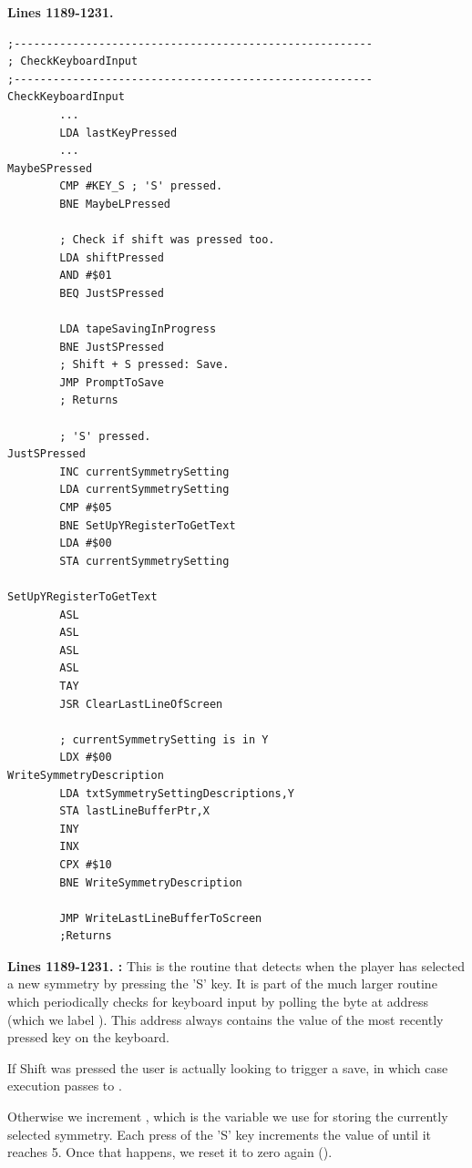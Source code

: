 \clearpage
\textbf{Lines 1189-1231. }
\begin{lstlisting}
;-------------------------------------------------------
; CheckKeyboardInput
;-------------------------------------------------------
CheckKeyboardInput   
        ...
        LDA lastKeyPressed
        ...
MaybeSPressed   
        CMP #KEY_S ; 'S' pressed.
        BNE MaybeLPressed

        ; Check if shift was pressed too.
        LDA shiftPressed
        AND #$01
        BEQ JustSPressed

        LDA tapeSavingInProgress
        BNE JustSPressed
        ; Shift + S pressed: Save.
        JMP PromptToSave
        ; Returns

        ; 'S' pressed. 
JustSPressed   
        INC currentSymmetrySetting
        LDA currentSymmetrySetting
        CMP #$05
        BNE SetUpYRegisterToGetText
        LDA #$00
        STA currentSymmetrySetting

SetUpYRegisterToGetText   
        ASL 
        ASL 
        ASL 
        ASL 
        TAY 
        JSR ClearLastLineOfScreen

        ; currentSymmetrySetting is in Y
        LDX #$00
WriteSymmetryDescription   
        LDA txtSymmetrySettingDescriptions,Y
        STA lastLineBufferPtr,X
        INY 
        INX 
        CPX #$10
        BNE WriteSymmetryDescription

        JMP WriteLastLineBufferToScreen
        ;Returns
\end{lstlisting}
\clearpage

\textbf{Lines 1189-1231. :} This is the routine that detects when the player has selected a new
symmetry by pressing the 'S' key. It is part of the much larger routine  which periodically checks
for keyboard input by polling the byte at address  (which we label ). This address always
contains the value of the most recently pressed key on the keyboard.

If Shift was pressed the user is actually looking to trigger a save, in which case execution passes to .

Otherwise we increment , which is the variable we use for storing the currently selected symmetry.
Each press of the 'S' key increments the value of  until it reaches 5. Once that happens, we 
reset it to zero again ().

